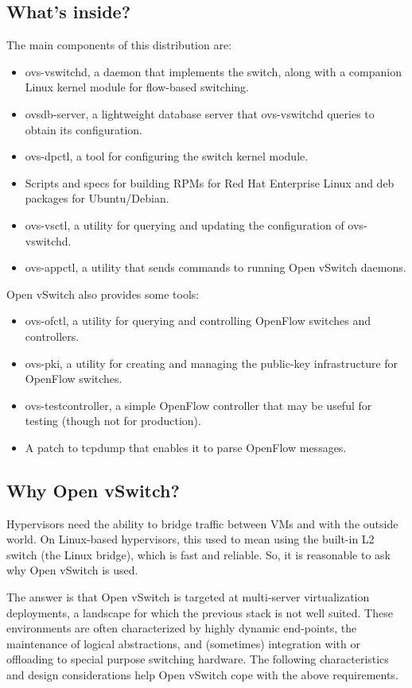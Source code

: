 \documentclass[../sn.tex]{subfiles}
\begin{document}
\subsection{What's inside?}
The main components of this distribution are:

\begin{itemize}
    \item ovs-vswitchd, a daemon that implements the switch, along with a companion Linux kernel module for flow-based switching.
    \item ovsdb-server, a lightweight database server that ovs-vswitchd queries to obtain its configuration.
    \item ovs-dpctl, a tool for configuring the switch kernel module.
    \item Scripts and specs for building RPMs for Red Hat Enterprise Linux and deb packages for Ubuntu/Debian.
    \item ovs-vsctl, a utility for querying and updating the configuration of ovs-vswitchd.
    \item ovs-appctl, a utility that sends commands to running Open vSwitch daemons.
\end{itemize}Open vSwitch also provides some tools:
\begin{itemize}
    \item ovs-ofctl, a utility for querying and controlling OpenFlow switches and controllers.
    \item ovs-pki, a utility for creating and managing the public-key infrastructure for OpenFlow switches.
    \item ovs-testcontroller, a simple OpenFlow controller that may be useful for testing (though not for production).
    \item A patch to tcpdump that enables it to parse OpenFlow messages.
\end{itemize}

\subsection{Why Open vSwitch?}
Hypervisors need the ability to bridge traffic between VMs and with the outside world. 
On Linux-based hypervisors, this used to mean using the built-in L2 switch (the Linux bridge), which is fast and reliable.
So, it is reasonable to ask why Open vSwitch is used.

The answer is that Open vSwitch is targeted at multi-server virtualization deployments, a landscape for which the previous stack is not well suited.
These environments are often characterized by highly dynamic end-points, the maintenance of logical abstractions, and (sometimes) integration with or offloading to special purpose switching hardware.
The following characteristics and design considerations help Open vSwitch cope with the above requirements.
\end{document}
